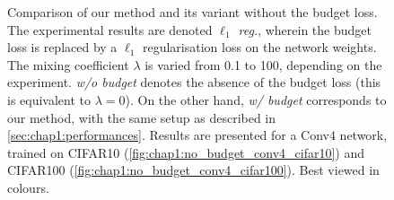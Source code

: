 \begin{figure}
  \centering
    \caption{ Comparison of our method and its variant without the budget loss.
    The experimental results are denoted \emph{$\ell_1$ reg.}, wherein the budget
    loss is replaced by a $\ell_1$ regularisation loss on the network weights. The
    mixing coefficient $\lambda$ is varied from 0.1 to 100, depending on the
    experiment. \emph{w/o budget} denotes the absence of the budget loss (this
    is equivalent to $\lambda = 0$). On the other hand, \emph{w/ budget}
    corresponds to our method, with the same setup as described in
    \cref{sec:chap1:performances}. Results are presented for a Conv4 network,
    trained on CIFAR10 (\cref{fig:chap1:no_budget_conv4_cifar10}) and CIFAR100
    (\cref{fig:chap1:no_budget_conv4_cifar100}). Best viewed in colours.} 
      \label{fig:chap1:no_budget_conv4}
\end{figure}
  
  


